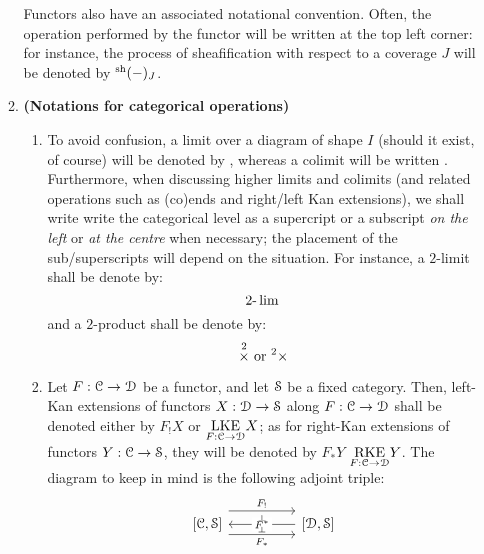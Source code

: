 \begin{enumerate}
\begin{enumerate}
                Functors also have an associated notational convention. Often, the operation performed by the functor will be written at the top left corner: for instance, the process of sheafification with respect to a coverage $J$ will be denoted by ${}^{\sh}(-)_J$.
                \item \textbf{(Notations for categorical operations)} 
                    \begin{enumerate}
                        \item To avoid confusion, a limit over a diagram of shape $I$ (should it exist, of course) will be denoted by , whereas a colimit will be written . Furthermore, when discussing higher limits and colimits (and related operations such as (co)ends and right/left Kan extensions), we shall write write the categorical level as a supercript or a subscript \textit{on the left} or \textit{at the centre} when necessary; the placement of the sub/superscripts will depend on the situation. For instance, a $2$-limit shall be denote by:
                            $$2\-\lim$$
                        and a $2$-product shall be denote by:
                            $$\text{$\x^2$ or ${}^2\x$}$$
                        \item Let $F: \C \to \D$ be a functor, and let $\S$ be a fixed  category. Then, left-Kan extensions of functors $X: \D \to \S$ along $F: \C \to \D$ shall be denoted either by $F_! X$ or $\underset{F: \C \to \D}{\LKE} X$; as for right-Kan extensions of functors $Y: \C \to \S$, they will be denoted by $F_* Y$ $\underset{F: \C \to \D}{\RKE} Y$. The diagram to keep in mind is the following adjoint triple:
                            $$
                                \begin{tikzcd}
                                	{[\C, \S]} && {[\D, \S]}
                                	\arrow[""{name=0, anchor=center, inner sep=0}, "{F^*}"{description}, from=1-3, to=1-1]
                                	\arrow[""{name=1, anchor=center, inner sep=0}, "{F_*}"', shift right=3, from=1-1, to=1-3]
                                	\arrow[""{name=2, anchor=center, inner sep=0}, "{F_!}", shift left=4, from=1-1, to=1-3]
                                	\arrow["\dashv"{anchor=center, rotate=-90}, draw=none, from=2, to=0]
                                	\arrow["\dashv"{anchor=center, rotate=-90}, draw=none, from=0, to=1]
                                \end{tikzcd}
                            $$

\end{enumerate}
\end{enumerate}
\end{enumerate}
